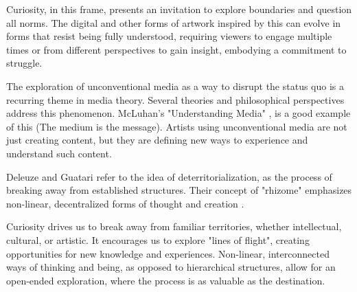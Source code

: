 Curiosity, in this frame, presents an invitation to explore boundaries and question all norms. The digital and other forms of artwork inspired by this can evolve in forms that resist being fully understood, requiring viewers to engage multiple times or from different perspectives to gain insight, embodying a commitment to struggle.

The exploration of unconventional media as a way to disrupt the status quo is a recurring theme in media theory. Several theories and philosophical perspectives address this phenomenon. McLuhan's "Understanding Media" \citep{mcluhan1964}, is a good example of this (The medium is the message). Artists using unconventional media are not just creating content, but they are defining new ways to experience and understand such content.

Deleuze and Guatari refer to the idea of deterritorialization, as the process of breaking away from established structures. Their concept of "rhizome" emphasizes non-linear, decentralized forms of thought and creation \citep{deleuze1980}.

Curiosity drives us to break away from familiar territories, whether intellectual, cultural, or artistic. It encourages us to explore "lines of flight", creating opportunities for new knowledge and experiences. Non-linear, interconnected ways of thinking and being, as opposed to hierarchical structures, allow for an open-ended exploration, where the process is as valuable as the destination.
